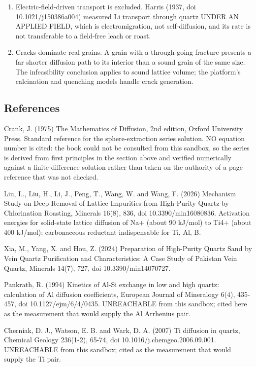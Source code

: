 \documentclass[10pt,a4paper,twoside]{report}
\begin{document}
\begin{enumerate}[leftmargin=*,label=\arabic*.]
\item Electric-field-driven transport is excluded. Harris (1937, doi 10.1021/j150386a004) measured Li transport through quartz UNDER AN APPLIED FIELD, which is electromigration, not self-diffusion, and its rate is not transferable to a field-free leach or roast.
\item Cracks dominate real grains. A grain with a through-going fracture presents a far shorter diffusion path to its interior than a sound grain of the same size. The infeasibility conclusion applies to sound lattice volume; the platform's calcination and quenching models handle crack generation.
\end{enumerate}

\subsection*{References}

Crank, J. (1975) The Mathematics of Diffusion, 2nd edition, Oxford University Press. Standard reference for the sphere-extraction series solution. NO equation number is cited: the book could not be consulted from this sandbox, so the series is derived from first principles in the section above and verified numerically against a finite-difference solution rather than taken on the authority of a page reference that was not checked.

Liu, L., Liu, H., Li, J., Peng, T., Wang, W. and Wang, F. (2026) Mechanism Study on Deep Removal of Lattice Impurities from High-Purity Quartz by Chlorination Roasting, Minerals 16(8), 836, doi 10.3390/min16080836. Activation energies for solid-state lattice diffusion of Na+ (about 90 kJ/mol) to Ti4+ (about 400 kJ/mol); carbonaceous reductant indispensable for Ti, Al, B.

Xia, M., Yang, X. and Hou, Z. (2024) Preparation of High-Purity Quartz Sand by Vein Quartz Purification and Characteristics: A Case Study of Pakistan Vein Quartz, Minerals 14(7), 727, doi 10.3390/min14070727.

Pankrath, R. (1994) Kinetics of Al-Si exchange in low and high quartz: calculation of Al diffusion coefficients, European Journal of Mineralogy 6(4), 435-457, doi 10.1127/ejm/6/4/0435. UNREACHABLE from this sandbox; cited here as the measurement that would supply the Al Arrhenius pair.

Cherniak, D. J., Watson, E. B. and Wark, D. A. (2007) Ti diffusion in quartz, Chemical Geology 236(1-2), 65-74, doi 10.1016/j.chemgeo.2006.09.001. UNREACHABLE from this sandbox; cited as the measurement that would supply the Ti pair.
\end{document}
